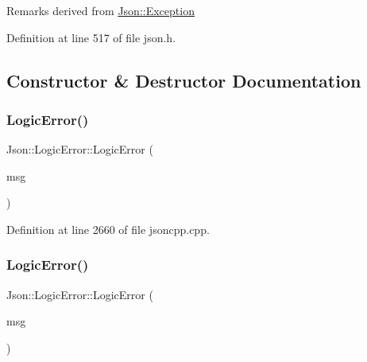 \begin{DoxyRemark}{Remarks}
derived from \hyperlink{class_json_1_1_exception}{Json\+::\+Exception} 
\end{DoxyRemark}


Definition at line 517 of file json.\+h.



\subsection{Constructor \& Destructor Documentation}
\hypertarget{class_json_1_1_logic_error_acca679aa49768a4a1de7b705c67c2919}{}\label{class_json_1_1_logic_error_acca679aa49768a4a1de7b705c67c2919} 
\subsubsection{\texorpdfstring{Logic\+Error()}{LogicError()}\hspace{0.1cm}{\footnotesize\ttfamily [1/2]}}
{\footnotesize\ttfamily Json\+::\+Logic\+Error\+::\+Logic\+Error (\begin{DoxyParamCaption}\item[{\hyperlink{config_8h_a1e723f95759de062585bc4a8fd3fa4be}{J\+S\+O\+N\+C\+P\+P\+\_\+\+S\+T\+R\+I\+NG} const \&}]{msg }\end{DoxyParamCaption})}



Definition at line 2660 of file jsoncpp.\+cpp.

\hypertarget{class_json_1_1_logic_error_acca679aa49768a4a1de7b705c67c2919}{}\label{class_json_1_1_logic_error_acca679aa49768a4a1de7b705c67c2919} 
\subsubsection{\texorpdfstring{Logic\+Error()}{LogicError()}\hspace{0.1cm}{\footnotesize\ttfamily [2/2]}}
{\footnotesize\ttfamily Json\+::\+Logic\+Error\+::\+Logic\+Error (\begin{DoxyParamCaption}\item[{\hyperlink{config_8h_a1e723f95759de062585bc4a8fd3fa4be}{J\+S\+O\+N\+C\+P\+P\+\_\+\+S\+T\+R\+I\+NG} const \&}]{msg }\end{DoxyParamCaption})}



